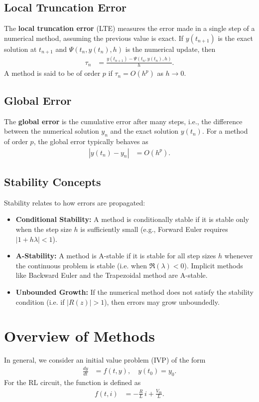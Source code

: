 \documentclass[12pt]{article}
\begin{document}
\subsection*{Local Truncation Error}
The \textbf{local truncation error} (LTE) measures the error made in a single step of a numerical method, assuming the previous value is exact. If $y(t_{n+1})$ is the exact solution at $t_{n+1}$ and $\Psi(t_n,y(t_n),h)$ is the numerical update, then
\begin{align}
\tau_n &= \frac{y(t_{n+1}) - \Psi(t_n,y(t_n),h)}{h}.
\end{align}
A method is said to be of order $p$ if $\tau_n = O(h^p)$ as $h\to0$.

\subsection*{Global Error}
The \textbf{global error} is the cumulative error after many steps, i.e., the difference between the numerical solution $y_n$ and the exact solution $y(t_n)$. For a method of order $p$, the global error typically behaves as
\begin{align}
|y(t_n)-y_n| &= O(h^p).
\end{align}

\subsection*{Stability Concepts}
Stability relates to how errors are propagated:
\begin{itemize}
    \item \textbf{Conditional Stability:} A method is conditionally stable if it is stable only when the step size $h$ is sufficiently small (e.g., Forward Euler requires $|1+h\lambda|<1$).
    \item \textbf{A-Stability:} A method is A-stable if it is stable for all step sizes $h$ whenever the continuous problem is stable (i.e. when $\Re(\lambda)<0$). Implicit methods like Backward Euler and the Trapezoidal method are A-stable.
    \item \textbf{Unbounded Growth:} If the numerical method does not satisfy the stability condition (i.e. if $|R(z)|>1$), then errors may grow unboundedly.
\end{itemize}

\section{Overview of Methods}
In general, we consider an initial value problem (IVP) of the form 
\begin{align}
\frac{dy}{dt} &= f(t,y), \quad y(t_0)=y_0.
\end{align}
For the RL circuit, the function is defined as 
\begin{align}
f(t,i) &= -\frac{R}{L}\, i + \frac{V_{\text{in}}}{L}.
\end{align}
\end{document}
